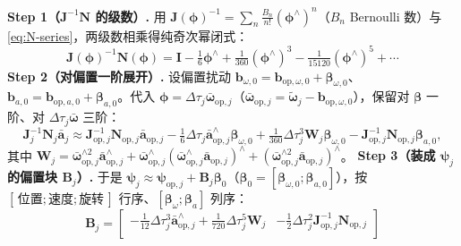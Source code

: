 \begin{derivation}
\label{deriv:preint-B0}
\textbf{Step 1（$\mathbf{J}^{-1}\mathbf{N}$ 的级数）.}\; 用 $\mathbf{J}(\boldsymbol{\phi})^{-1}=\sum_n\frac{B_n}{n!}(\boldsymbol{\phi}^\wedge)^n$（$B_n$ Bernoulli 数）与 \cref{eq:N-series}，两级数相乘得纯奇次幂闭式\cite{barfoot2024state}：
\begin{equation}
  \mathbf{J}(\boldsymbol{\phi})^{-1}\mathbf{N}(\boldsymbol{\phi})
  =\mathbf{I}-\tfrac16\boldsymbol{\phi}^\wedge+\tfrac{1}{360}(\boldsymbol{\phi}^\wedge)^3-\tfrac{1}{15120}(\boldsymbol{\phi}^\wedge)^5+\cdots
  \label{eq:JinvN}
\end{equation}
\textbf{Step 2（对偏置一阶展开）.}\; 设偏置扰动 $\mathbf{b}_{\omega,0}=\mathbf{b}_{\mathrm{op},\omega,0}+\boldsymbol{\beta}_{\omega,0}$、$\mathbf{b}_{a,0}=\mathbf{b}_{\mathrm{op},a,0}+\boldsymbol{\beta}_{a,0}$。代入 $\boldsymbol{\phi}=\Delta\tau_j\bar{\boldsymbol{\omega}}_{\mathrm{op},j}$（$\bar{\boldsymbol{\omega}}_{\mathrm{op},j}=\tilde{\boldsymbol{\omega}}_j-\mathbf{b}_{\mathrm{op},\omega,0}$），保留对 $\boldsymbol{\beta}$ 一阶、对 $\Delta\tau_j\bar{\boldsymbol{\omega}}$ 三阶：
\begin{equation}
  \mathbf{J}_j^{-1}\mathbf{N}_j\bar{\mathbf{a}}_j\approx\mathbf{J}_{\mathrm{op},j}^{-1}\mathbf{N}_{\mathrm{op},j}\bar{\mathbf{a}}_{\mathrm{op},j}
  -\tfrac16\Delta\tau_j\bar{\mathbf{a}}_{\mathrm{op},j}^\wedge\boldsymbol{\beta}_{\omega,0}
  +\tfrac{1}{360}\Delta\tau_j^3\mathbf{W}_j\boldsymbol{\beta}_{\omega,0}
  -\mathbf{J}_{\mathrm{op},j}^{-1}\mathbf{N}_{\mathrm{op},j}\boldsymbol{\beta}_{a,0},
  \label{eq:preint-bias-firstorder}
\end{equation}
其中 $\mathbf{W}_j=\bar{\boldsymbol{\omega}}_{\mathrm{op},j}^{\wedge2}\bar{\mathbf{a}}_{\mathrm{op},j}^\wedge+\bar{\boldsymbol{\omega}}_{\mathrm{op},j}^\wedge(\bar{\boldsymbol{\omega}}_{\mathrm{op},j}^\wedge\bar{\mathbf{a}}_{\mathrm{op},j})^\wedge+(\bar{\boldsymbol{\omega}}_{\mathrm{op},j}^{\wedge2}\bar{\mathbf{a}}_{\mathrm{op},j})^\wedge$。
\textbf{Step 3（装成 $\boldsymbol{\psi}_j$ 的偏置块 $\mathbf{B}_j$）.}\; 于是 $\boldsymbol{\psi}_j\approx\boldsymbol{\psi}_{\mathrm{op},j}+\mathbf{B}_j\boldsymbol{\beta}_0$（$\boldsymbol{\beta}_0=[\boldsymbol{\beta}_{\omega,0};\boldsymbol{\beta}_{a,0}]$），按 $[\,\text{位置};\text{速度};\text{旋转}\,]$ 行序、$[\boldsymbol{\beta}_\omega;\boldsymbol{\beta}_a]$ 列序：
\begin{equation}
  \mathbf{B}_j=\begin{bmatrix}
  -\tfrac{1}{12}\Delta\tau_j^3\bar{\mathbf{a}}_{\mathrm{op},j}^\wedge+\tfrac{1}{720}\Delta\tau_j^5\mathbf{W}_j & -\tfrac12\Delta\tau_j^2\mathbf{J}_{\mathrm{op},j}^{-1}\mathbf{N}_{\mathrm{op},j}\\

\end{bmatrix}
\end{equation}
\end{derivation}
